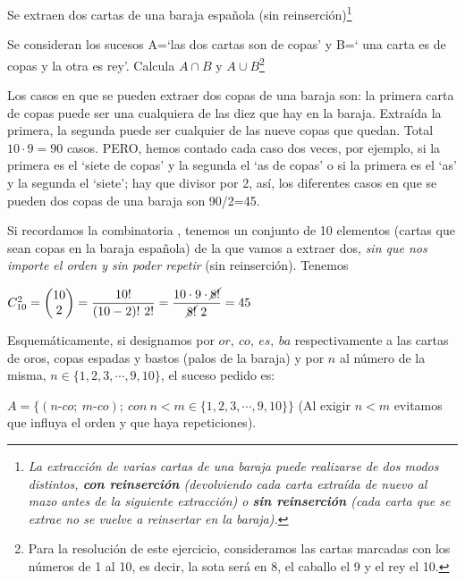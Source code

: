 \begin{ejemplo}
\begin{ejre}
Se extraen dos cartas de una baraja española (sin reinserción)\footnote{\emph{La extracción de varias cartas de una baraja puede realizarse de dos modos distintos, \textbf{con reinserción} (devolviendo cada carta extraída de nuevo al mazo antes de la siguiente extracción) o \textbf{sin reinserción} (cada carta que se extrae no se vuelve a reinsertar en la baraja).}}

Se consideran los sucesos A=`las dos cartas son de copas' y B=` una carta es de copas y la otra es rey'. Calcula $A\cap B$ y $A\cup B$\footnote{Para la resolución de este ejercicio, consideramos las cartas marcadas con los números de 1 al 10, es decir, la sota será en 8, el caballo el 9 y el rey el 10.}
\end{ejre}
\vspace{4mm} 

Los casos en que se pueden extraer dos copas de una baraja son: la primera carta de copas puede ser una cualquiera de las diez que hay en la baraja. Extraída la primera, la segunda puede ser cualquier de las nueve copas que quedan. Total $10\cdot 9=90$ casos. PERO, hemos contado cada caso dos veces, por ejemplo, si la primera es el `siete de copas' y la segunda el `as de copas' o si la primera es el `as' y la segunda el `siete'; hay que divisor por 2, así, los diferentes casos en que se pueden dos copas de una baraja son 90/2=45.

Si recordamos la combinatoria , tenemos un conjunto de 10 elementos (cartas  que sean copas en la baraja española) de la que vamos a extraer dos, \emph{sin que nos importe el orden y sin poder repetir} (sin reinserción). Tenemos 

$C_{10}^2=\mqty(10\\2)=\dfrac{10!}{(10-2)!\ 2!}=\dfrac {10\cdot 9\cdot \cancel{8!}}{\cancel{8!}\ 2}=45$

Esquemáticamente, si designamos por  $or,\ co,\ es,\ ba$ respectivamente a las cartas de oros, copas espadas y bastos (palos de la baraja) y por $n$ al número de la misma, $n\in \{1,2,3,\cdots, 9, 10\}$, el suceso pedido es:

$A=\{(n\text{-}co;\ m\text{-}co);\ con \ n<m\in \{1,2,3,\cdots, 9, 10\} \}$ \textcolor{gris}{(Al exigir $n<m$ evitamos que influya el orden y que haya repeticiones).}




\end{ejemplo}
